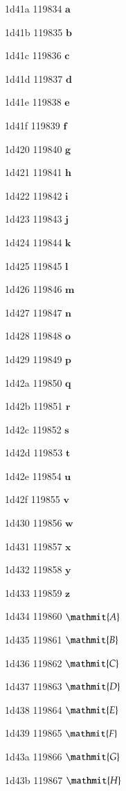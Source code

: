 \documentclass[11pt]{article}
\begin{document}
1d41a 119834 \ensuremath{\mathbf{a}}

1d41b 119835 \ensuremath{\mathbf{b}}

1d41c 119836 \ensuremath{\mathbf{c}}

1d41d 119837 \ensuremath{\mathbf{d}}

1d41e 119838 \ensuremath{\mathbf{e}}

1d41f 119839 \ensuremath{\mathbf{f}}

1d420 119840 \ensuremath{\mathbf{g}}

1d421 119841 \ensuremath{\mathbf{h}}

1d422 119842 \ensuremath{\mathbf{i}}

1d423 119843 \ensuremath{\mathbf{j}}

1d424 119844 \ensuremath{\mathbf{k}}

1d425 119845 \ensuremath{\mathbf{l}}

1d426 119846 \ensuremath{\mathbf{m}}

1d427 119847 \ensuremath{\mathbf{n}}

1d428 119848 \ensuremath{\mathbf{o}}

1d429 119849 \ensuremath{\mathbf{p}}

1d42a 119850 \ensuremath{\mathbf{q}}

1d42b 119851 \ensuremath{\mathbf{r}}

1d42c 119852 \ensuremath{\mathbf{s}}

1d42d 119853 \ensuremath{\mathbf{t}}

1d42e 119854 \ensuremath{\mathbf{u}}

1d42f 119855 \ensuremath{\mathbf{v}}

1d430 119856 \ensuremath{\mathbf{w}}

1d431 119857 \ensuremath{\mathbf{x}}

1d432 119858 \ensuremath{\mathbf{y}}

1d433 119859 \ensuremath{\mathbf{z}}

1d434 119860 \ensuremath{\mathmit{A}}

1d435 119861 \ensuremath{\mathmit{B}}

1d436 119862 \ensuremath{\mathmit{C}}

1d437 119863 \ensuremath{\mathmit{D}}

1d438 119864 \ensuremath{\mathmit{E}}

1d439 119865 \ensuremath{\mathmit{F}}

1d43a 119866 \ensuremath{\mathmit{G}}

1d43b 119867 \ensuremath{\mathmit{H}}
\end{document}
